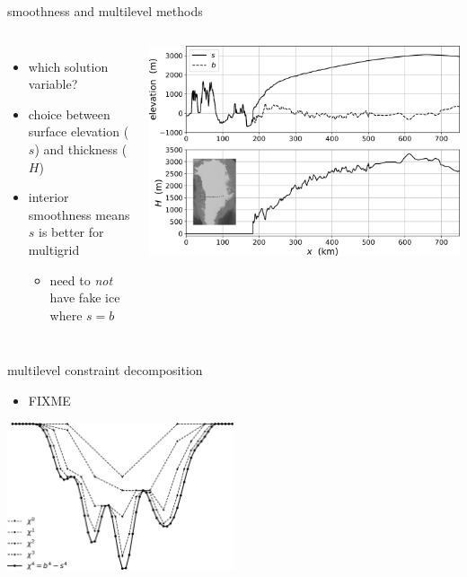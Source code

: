 \documentclass[usepdftitle=false]{beamer}
\begin{document}
\begin{frame}{smoothness and multilevel methods}

\begin{columns}
    \begin{itemize}
    \small
    \item which solution variable?
    \item choice between surface elevation ($s$) and thickness ($H$)
    \item interior smoothness means $s$ is better for multigrid
        \begin{itemize}
        \item need to \emph{not} have fake ice where $s=b$
        \end{itemize}
    \end{itemize}
    \includegraphics[width=\textwidth]{figs/giscross.png}
\end{columns}
\end{frame}


\begin{frame}{multilevel constraint decomposition}

\begin{itemize}
\item FIXME
\end{itemize}

\includegraphics[width=0.5\textwidth]{figs/decompclassical.png}


\end{frame}
\end{document}
